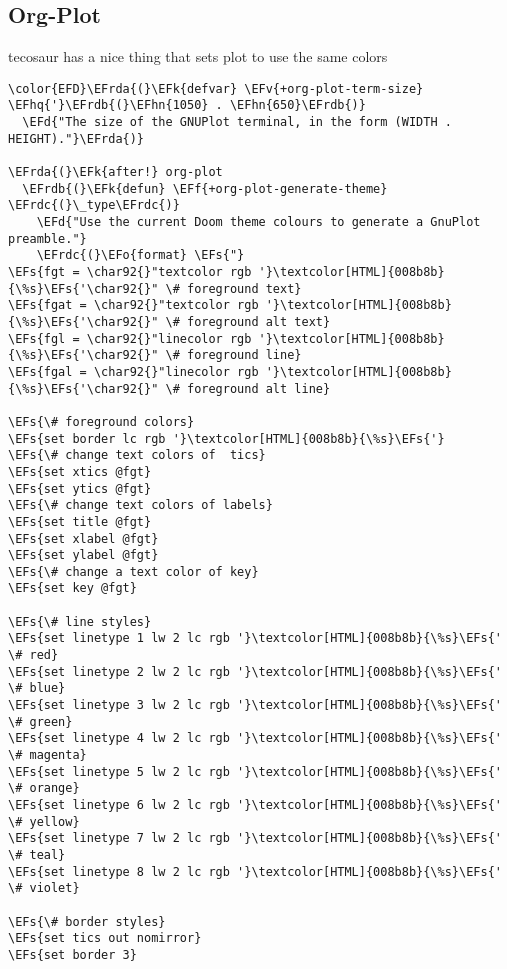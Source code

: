 \documentclass{article}
\newcommand{\EFs}[1]{\textcolor{EFs}{#1}} %
\newcommand{\EFd}[1]{\textcolor{EFd}{#1}} %
\newcommand{\EFk}[1]{\textcolor{EFk}{#1}} %
\newcommand{\EFf}[1]{\textcolor{EFf}{#1}} %
\newcommand{\EFv}[1]{\textcolor{EFv}{#1}} %
\newcommand{\EFo}[1]{\textcolor{EFo}{#1}} %
\newcommand{\EFhn}[1]{\textcolor{EFhn}{\textbf{#1}}} %
\newcommand{\EFhq}[1]{#1} %
\newcommand{\EFrda}[1]{\textcolor{EFrda}{#1}} %
\newcommand{\EFrdb}[1]{\textcolor{EFrdb}{#1}} %
\newcommand{\EFrdc}[1]{\textcolor{EFrdc}{#1}} %
\begin{document}
\subsection{Org-Plot}
\label{sec:org99cb720}
tecosaur has a nice thing that sets plot to use the same colors
\begin{Code}
\begin{Verbatim}
\color{EFD}\EFrda{(}\EFk{defvar} \EFv{+org-plot-term-size} \EFhq{'}\EFrdb{(}\EFhn{1050} . \EFhn{650}\EFrdb{)}
  \EFd{"The size of the GNUPlot terminal, in the form (WIDTH . HEIGHT)."}\EFrda{)}

\EFrda{(}\EFk{after!} org-plot
  \EFrdb{(}\EFk{defun} \EFf{+org-plot-generate-theme} \EFrdc{(}\_type\EFrdc{)}
    \EFd{"Use the current Doom theme colours to generate a GnuPlot preamble."}
    \EFrdc{(}\EFo{format} \EFs{"}
\EFs{fgt = \char92{}"textcolor rgb '}\textcolor[HTML]{008b8b}{\%s}\EFs{'\char92{}" \# foreground text}
\EFs{fgat = \char92{}"textcolor rgb '}\textcolor[HTML]{008b8b}{\%s}\EFs{'\char92{}" \# foreground alt text}
\EFs{fgl = \char92{}"linecolor rgb '}\textcolor[HTML]{008b8b}{\%s}\EFs{'\char92{}" \# foreground line}
\EFs{fgal = \char92{}"linecolor rgb '}\textcolor[HTML]{008b8b}{\%s}\EFs{'\char92{}" \# foreground alt line}

\EFs{\# foreground colors}
\EFs{set border lc rgb '}\textcolor[HTML]{008b8b}{\%s}\EFs{'}
\EFs{\# change text colors of  tics}
\EFs{set xtics @fgt}
\EFs{set ytics @fgt}
\EFs{\# change text colors of labels}
\EFs{set title @fgt}
\EFs{set xlabel @fgt}
\EFs{set ylabel @fgt}
\EFs{\# change a text color of key}
\EFs{set key @fgt}

\EFs{\# line styles}
\EFs{set linetype 1 lw 2 lc rgb '}\textcolor[HTML]{008b8b}{\%s}\EFs{' \# red}
\EFs{set linetype 2 lw 2 lc rgb '}\textcolor[HTML]{008b8b}{\%s}\EFs{' \# blue}
\EFs{set linetype 3 lw 2 lc rgb '}\textcolor[HTML]{008b8b}{\%s}\EFs{' \# green}
\EFs{set linetype 4 lw 2 lc rgb '}\textcolor[HTML]{008b8b}{\%s}\EFs{' \# magenta}
\EFs{set linetype 5 lw 2 lc rgb '}\textcolor[HTML]{008b8b}{\%s}\EFs{' \# orange}
\EFs{set linetype 6 lw 2 lc rgb '}\textcolor[HTML]{008b8b}{\%s}\EFs{' \# yellow}
\EFs{set linetype 7 lw 2 lc rgb '}\textcolor[HTML]{008b8b}{\%s}\EFs{' \# teal}
\EFs{set linetype 8 lw 2 lc rgb '}\textcolor[HTML]{008b8b}{\%s}\EFs{' \# violet}

\EFs{\# border styles}
\EFs{set tics out nomirror}
\EFs{set border 3}


\end{Verbatim}
\end{Code}
\end{document}

